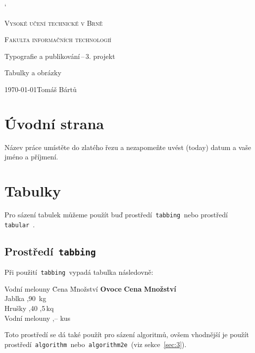 \documentclass[a4paper,11pt]{article}[20-03-2022]
\begin{document}
\catcode`
\color{red}
\begin{titlepage}
    \begin{center}
        \Huge \textsc{Vysoké učení technické v Brně}

        \huge \textsc{Fakulta informačních technologií}


        \LARGE Typografie a publikování\,--\,3. projekt

        \Huge Tabulky a obrázky

    \end{center}
    {\Large \today \hfill Tomáš Bártů}    
\end{titlepage}

\section{Úvodní strana}
Název práce umístěte do zlatého řezu a nezapomeňte uvést     (today) datum a vaše jméno a příjmení.

\section{Tabulky}
Pro sázení tabulek můžeme použít buď prostředí\texttt{ tabbing }nebo prostředí\texttt{ tabular }.

\subsection{Prostředí\texttt{ tabbing }}
Při použití\texttt{ tabbing }vypadá tabulka následovně:
\begin{tabbing}
    Vodní melouny \quad \= Cena \quad \= Množství \kill
    \textbf{Ovoce}      \> \textbf{Cena} \> \textbf{Množství}\\
    Jablka              ,90         \,kg\\
    Hrušky              ,40         ,5\,kq\\
    Vodní melouny       ,--          kus\\
\end{tabbing}
Toto prostředí se dá také použít pro sázení algoritmů, ovšem vhodnější je použít prostředí\texttt{ algorithm }nebo\texttt{ algorithm2e }(viz sekce~\ref{sec:3}).
\end{document}

